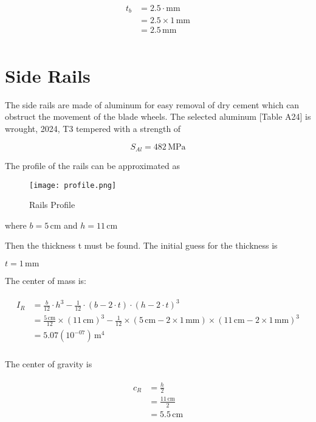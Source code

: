 \documentclass{article}
\begin{document}
\begin{align}
\begin{split}
t_{b}	&= 2.5 \cdot \mathrm{mm}\\
		&= 2.5 \times 1\,\mathrm{mm}\\
		&= 2.5\,\mathrm{mm}\\
\end{split}
\end{align}

\section{Side Rails}

The side rails are made of aluminum for easy removal of dry cement which can obstruct the movement of the blade wheels. The selected aluminum [Table A24] is wrought, 2024, T3 tempered with a strength of

\begin{equation}
S_{Al}	= 482\,\mathrm{MPa}
\end{equation}

The profile of the rails can be approximated as

\begin{figure}
	\centering
	\texttt{[image: profile.png]}
	\caption{Rails Profile}
	\label{first}
\end{figure}
where $b = 5\,\mathrm{cm}$ and $h = 11\,\mathrm{cm}$

Then the thickness t must be found. The initial guess for the thickness is

$t = 1\,\mathrm{mm}$

The center of mass is:

\begin{align}
\begin{split}
I_{R}	&= \frac{b}{12} \cdot h^{3} - \frac{1}{12} \cdot \left(b - 2 \cdot t\right) \cdot \left(h - 2 \cdot t\right)^{3}\\
		&= \frac{5\,\mathrm{cm}}{12} \times \left(11\,\mathrm{cm}\right)^{3} - \frac{1}{12} \times \left(5\,\mathrm{cm} - 2 \times 1\,\mathrm{mm}\right) \times \left(11\,\mathrm{cm} - 2 \times 1\,\mathrm{mm}\right)^{3}\\
		&= 5.07(10^{-07})\,\mathrm{m^{4}}\\
\end{split}
\end{align}

The center of gravity is

\begin{align}
\begin{split}
c_{R}	&= \frac{h}{2}\\
		&= \frac{11\,\mathrm{cm}}{2}\\
		&= 5.5\,\mathrm{cm}\\
\end{split}
\end{align}
\end{document}
